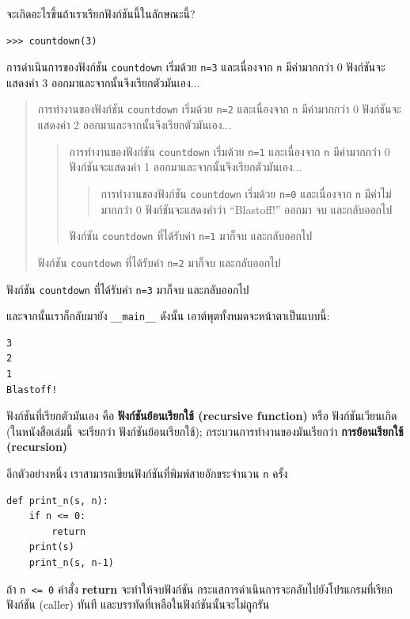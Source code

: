 จะเกิดอะไรขึ้นถ้าเราเรียกฟังก์ชันนี้ในลักษณะนี้?

\begin{verbatim}
>>> countdown(3)
\end{verbatim}
%
การดำเนินการของฟังก์ชัน {\tt countdown} เริ่มด้วย {\tt n=3} และเนื่องจาก {\tt n} มีค่ามากกว่า 0
ฟังก์ชันจะแสดงค่า 3 ออกมาและจากนั้นจึงเรียกตัวมันเอง...


\begin{quote}
การทำงานของฟังก์ชัน {\tt countdown} เริ่มด้วย {\tt n=2} และเนื่องจาก {\tt n} มีค่ามากกว่า 0
ฟังก์ชันจะแสดงค่า 2 ออกมาและจากนั้นจึงเรียกตัวมันเอง...

\begin{quote}
การทำงานของฟังก์ชัน {\tt countdown} เริ่มด้วย {\tt n=1} และเนื่องจาก {\tt n} มีค่ามากกว่า 0
ฟังก์ชันจะแสดงค่า 1 ออกมาและจากนั้นจึงเรียกตัวมันเอง...

\begin{quote}
การทำงานของฟังก์ชัน {\tt countdown} เริ่มด้วย {\tt n=0} และเนื่องจาก {\tt n} มีค่าไม่มากกว่า 0
ฟังก์ชันจะแสดงคำว่า ``Blastoff!'' ออกมา จบ และกลับออกไป
\end{quote}

ฟังก์ชัน {\tt countdown} ที่ได้รับค่า {\tt n=1} มาก็จบ และกลับออกไป
\end{quote}

ฟังก์ชัน {\tt countdown} ที่ได้รับค่า {\tt n=2} มาก็จบ และกลับออกไป
\end{quote}

ฟังก์ชัน {\tt countdown} ที่ได้รับค่า {\tt n=3} มาก็จบ และกลับออกไป

และจากนั้นเราก็กลับมายัง \verb"__main__"  ดังนั้น เอาต์พุตทั้งหมดจะหน้าตาเป็นแบบนี้:

\begin{verbatim}
3
2
1
Blastoff!
\end{verbatim}
% 
ฟังก์ชันที่เรียกตัวมันเอง คือ {\bf ฟังก์ชันย้อนเรียกใช้ (recursive function)} หรือ ฟังก์ชันเวียนเกิด (ในหนังสือเล่มนี้
จะเรียกว่า ฟังก์ชันย้อนเรียกใช้); กระบวนการทำงานของมันเรียกว่า {\bf การย้อนเรียกใช้  (recursion)}

อีกตัวอย่างหนึ่ง เราสามารถเขียนฟังก์ชันที่พิมพ์สายอักขระจำนวน {\tt n} ครั้ง

\begin{verbatim}
def print_n(s, n):
    if n <= 0:
        return
    print(s)
    print_n(s, n-1)
\end{verbatim}
%
ถ้า {\tt n <= 0} คำสั่ง {\bf return} จะทำให้จบฟังก์ชัน กระแสการดำเนินการจะกลับไปยังโปรแกรมที่เรียกฟังก์ชัน (caller) ทันที
และบรรทัดที่เหลือในฟังก์ชันนั้นจะไม่ถูกรัน

